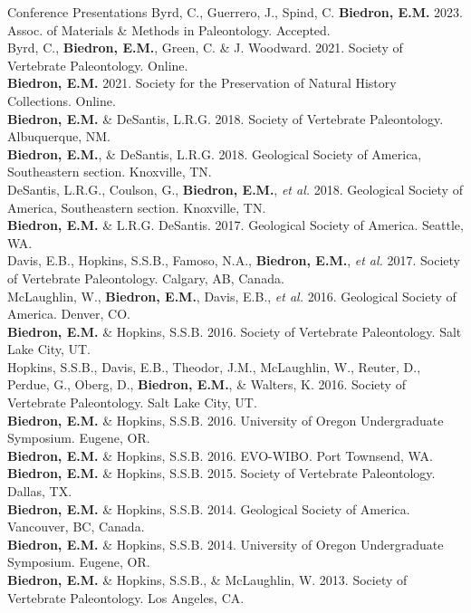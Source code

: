 \documentclass{resume} %
\begin{document}
	\begin{rSection}{Conference Presentations}
		\small
		Byrd, C., Guerrero, J., Spind, C. {\bf Biedron, E.M.} 2023. Assoc. of Materials \& Methods in Paleontology. Accepted. \\
		Byrd, C., {\bf Biedron, E.M.}, Green, C. \& J. Woodward. 2021. Society of Vertebrate Paleontology. Online. \\
		{\bf Biedron, E.M.} 2021. Society for the Preservation of Natural History Collections. Online. \\
		{\bf Biedron, E.M.} \& DeSantis, L.R.G. 2018. Society of Vertebrate Paleontology. Albuquerque, NM. \\		
		{\bf Biedron, E.M.}, \& DeSantis, L.R.G. 2018. Geological Society of America, Southeastern section. Knoxville, TN. \\
		DeSantis, L.R.G., Coulson, G., {\bf Biedron, E.M.}, {\em et al.} 2018. Geological Society of America, Southeastern section. 	Knoxville, TN. \\	
		{\bf Biedron, E.M.} \& L.R.G. DeSantis. 2017. Geological Society of America. Seattle, WA. \\	
		Davis, E.B., Hopkins, S.S.B., Famoso, N.A., {\bf Biedron, E.M.}, {\em et al.} 2017. Society of Vertebrate Paleontology. Calgary, AB, Canada. \\	
		McLaughlin, W., {\bf Biedron, E.M.}, Davis, E.B., {\em et al.} 2016. Geological Society of America. Denver, CO. \\
		{\bf Biedron, E.M.} \& Hopkins, S.S.B. 2016. Society of Vertebrate Paleontology. Salt Lake City, UT. \\	
		Hopkins, S.S.B., Davis, E.B., Theodor, J.M., McLaughlin, W., Reuter, D., Perdue, G., Oberg, D., {\bf Biedron, E.M.}, \& Walters, K. 2016. Society of Vertebrate Paleontology. Salt Lake City, UT. \\	
		{\bf Biedron, E.M.} \& Hopkins, S.S.B. 2016. University of Oregon Undergraduate Symposium. Eugene, OR. \\	
		{\bf Biedron, E.M.} \& Hopkins, S.S.B. 2016. EVO-WIBO. Port Townsend, WA. \\		
		{\bf Biedron, E.M.} \& Hopkins, S.S.B. 2015. Society of Vertebrate Paleontology. Dallas, TX. \\	
		{\bf Biedron, E.M.} \& Hopkins, S.S.B. 2014. Geological Society of America. Vancouver, BC, Canada. \\		
		{\bf Biedron, E.M.} \& Hopkins, S.S.B. 2014. University of Oregon Undergraduate Symposium. Eugene, OR. \\		
		{\bf Biedron, E.M.} \& Hopkins, S.S.B., \& McLaughlin, W. 2013. Society of Vertebrate Paleontology. Los Angeles, CA. \\
	\end{rSection}	
\end{document}
